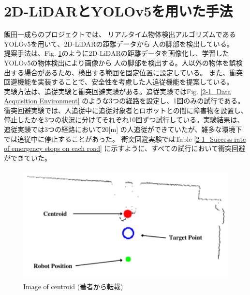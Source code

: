 \section{2D-LiDARとYOLOv5を用いた手法}
飯田一成らのプロジェクト\cite{深層学習を用いた人追従機能の開発}では、
リアルタイム物体検出アルゴリズムであるYOLOv5を用いて、2D-LiDARの距離データから
人の脚部を検出している。\\ \indent
提案手法は、Fig. \ref{2-1_Image of centroid}のように2D-LiDARの距離データを画像化し、学習したYOLOv5の物体検出により画像から
人の脚部を検出する。人以外の物体を誤検出する場合があるため、検出する範囲を固定位置に設定している。
また、衝突回避機能を実装することで、安全性を考慮した人追従機能を提案している。\\ \indent
実験方法は、追従実験と衝突回避実験がある。追従実験ではFig. \ref{2-1_Data Acquisition Environment} のような3つの経路を設定し、1回のみの試行である。
衝突回避実験では、人追従中に追従対象者とロボットとの間に障害物を設置し、停止したかを3つの状況に分けてそれぞれ10回ずつ試行している。実験結果は、追従実験では3つの経路において20[m]
の人追従ができていたが、雑多な環境下では追従中に停止することがあった。
衝突回避実験ではTable \ref{2-1_Success rate of emergency stops on each road}
に示すように、すべての試行において衝突回避ができていた。

\begin{figure}[h]
  \begin{center}
  \includegraphics[height=60mm,clip]{figure/2-1_Image-of-centroid.png}
  \caption{Image of centroid (著者\cite{深層学習を用いた人追従機能の開発}から転載)}
  \label{2-1_Image of centroid}
  \end{center}
\end{figure}

